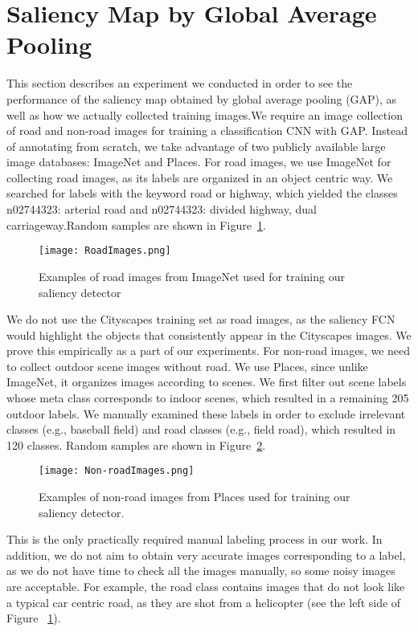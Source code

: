 \documentclass[10pt,twocolumn,letterpaper]{article}
\begin{document}
\section{Saliency Map by Global Average Pooling}
This section describes an experiment we conducted in
order to see the performance of the saliency map obtained
by global average pooling (GAP), as well as how we actually collected training images.We require an image collection of road and non-road images for training a classification CNN with GAP. Instead of annotating from scratch, we take advantage of two publicly available large image databases: ImageNet \cite{Russakovsky2014ImageNet} and Places\cite{Zhou2017Places}. For road images, we use ImageNet for collecting road images, as its labels are organized in an object centric way. We searched for labels with the keyword road or highway, which yielded the classes n02744323: arterial road and n02744323: divided highway, dual carriageway.Random samples are shown in Figure~\ref{fig:RoadImages}.
\begin{figure}[H]
\begin{center}

\texttt{[image: RoadImages.png]}
\end{center}
   \caption{Examples of road images from ImageNet used for training our saliency detector}
\label{fig:RoadImages}
\end{figure}
We do not use the Cityscapes training set as road images,
as the saliency FCN would highlight the objects that
consistently appear in the Cityscapes images. We prove this
empirically as a part of our experiments. For non-road images, we need to collect outdoor scene images without road.
We use Places, since unlike ImageNet, it organizes images
according to scenes. We first filter out scene labels whose
meta class corresponds to indoor scenes, which resulted in a
remaining 205 outdoor labels. We manually examined these
labels in order to exclude irrelevant classes (e.g., baseball
field) and road classes (e.g., field road), which resulted in
120 classes. Random samples are shown in Figure~\ref{fig:Non-roadImages}.

\begin{figure}[H]
\begin{center}

\texttt{[image: Non-roadImages.png]}
\end{center}
   \caption{Examples of non-road images from Places used for training our saliency detector.}
\label{fig:Non-roadImages}
\end{figure}
This is the only practically required manual labeling process
in our work. In addition, we do not aim to obtain very
accurate images corresponding to a label, as we do not have
time to check all the images manually, so some noisy images
are acceptable. For example, the road class contains
images that do not look like a typical car centric road, as
they are shot from a helicopter (see the left side of Figure ~\ref{fig:RoadImages}).
\end{document}
